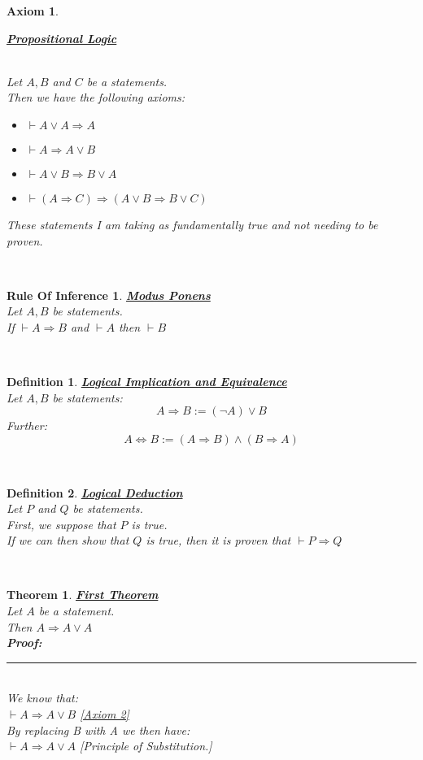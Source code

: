 \documentclass[12pt]{extarticle}
\theoremstyle{plain}
\newtheorem{thm}{Theorem}[section]
\theoremstyle{plain}
\newtheorem{axiom}{Axiom}[section]
\theoremstyle{plain}
\theoremstyle{Definition}
\newtheorem{def.}{Definition}[section]
\theoremstyle{Definition}
\theoremstyle{plain}
\theoremstyle{plain}
\newtheorem{ruleOfInference}{Rule Of Inference}[section]
\newcommand{\cut}[0]{\noindent\framebox[\linewidth]{\rule{\linewidth}{2pt}}\\}
\newcommand{\prof}[0]{	\noindent \textbf{Proof:} \rule{500pt}{2pt} \\ }
\begin{document}
\begin{axiom} \hypertarget{Axioms}{\underline{\textbf{Propositional Logic}} } \\
	Let $A,B$ and $C$ be a statements.\\
	Then we have the following axioms: 
	\begin{itemize}
		\item $\vdash A \lor A \Rightarrow A$ 
		\item $\vdash A \Rightarrow A \lor B$ 
		\item $\vdash A \lor B \Rightarrow B \lor A$ 
		\item $\vdash (A \Rightarrow C) \Rightarrow ( A \lor B \Rightarrow B \lor C ) $
	\end{itemize}
	These statements I am taking as fundamentally true and not needing to be proven. 
\end{axiom}
\cut 
\begin{ruleOfInference} \underline{\textbf{Modus Ponens}} \\
	Let $A,B$ be statements. \\
	If $\vdash A \Rightarrow B$ and $\vdash A$ then $\vdash B$ 
\end{ruleOfInference}
\cut
\begin{def.} \underline{\textbf{Logical Implication and Equivalence}} \\
	Let $A,B$ be statements: 
	$$A \Rightarrow B := (\lnot A) \lor B$$
	Further: 
	$$A \Leftrightarrow B := (A \Rightarrow B) \wedge (B \Rightarrow A)$$
\end{def.}
\cut
\begin{def.} \underline{\textbf{Logical Deduction}} \\
	Let $P$ and $Q$ be statements. \\ 
	First, we suppose that $P$ is true. \\
	If we can then show that $Q$ is true, then it is proven that $\vdash P \Rightarrow Q$
\end{def.}
\cut
\begin{thm} \underline{\textbf{First Theorem}} \\ 
	Let $A$ be a statement. \\ 
	Then $A \Rightarrow A \lor A $ \\ 
	\prof
	We know that: \\ 
	$\vdash A \Rightarrow A \lor B$ \hfill \hyperlink{Axioms}{[Axiom 2]}\\ 
	By replacing B with A we then have: \\ 
	$\vdash A \Rightarrow A \lor A$ \hfill [Principle of Substitution.] 
\end{thm}
\end{document}
